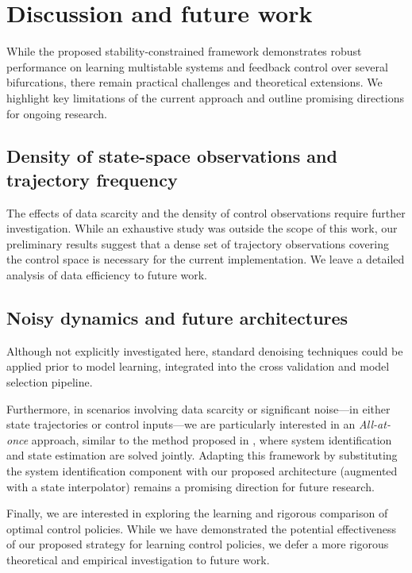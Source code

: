 \documentclass[11pt,twoside]{article}
\theoremstyle{plain}
\theoremstyle{definition}
\theoremstyle{remark}
\begin{document}
\section{Discussion and future work}
While the proposed stability-constrained framework demonstrates robust performance on learning multistable systems and feedback control over several bifurcations, there remain practical challenges and theoretical extensions. We highlight key limitations of the current approach and outline promising directions for ongoing research. 

\subsection*{Density of state-space observations and trajectory frequency}
The effects of data scarcity and the density of control observations require further investigation. While an exhaustive study was outside the scope of this work, our preliminary results suggest that a dense set of trajectory observations covering the control space is necessary for the current implementation. We leave a detailed analysis of data efficiency to future work.

\subsection*{Noisy dynamics and future architectures}
Although not explicitly investigated here, standard denoising techniques could be applied prior to model learning, integrated into the cross validation and model selection pipeline.

Furthermore, in scenarios involving data scarcity or significant noise---in either state trajectories or control inputs---we are particularly interested in an \emph{All-at-once} approach, similar to the method proposed in \cite{hsu2026jointoptimizationapproachidentifying}, where system identification and state estimation are solved jointly. Adapting this framework by substituting the system identification component with our proposed architecture (augmented with a state interpolator) remains a promising direction for future research.

Finally, we are interested in exploring the learning and rigorous comparison of optimal control policies. While we have demonstrated the potential effectiveness of our proposed strategy for learning control policies, we defer a more rigorous theoretical and empirical investigation to future work.
\end{document}
